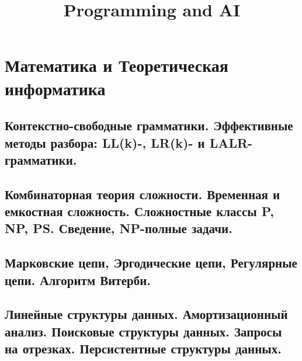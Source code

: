 \documentclass{article}
\title{Programming and AI} %
\begin{document}
	
\maketitle %
\tableofcontents
\section{Математика и Теоретическая информатика}





























\subsection{Контекстно-свободные грамматики. Эффективные методы разбора: LL(k)-, LR(k)- и LALR-грамматики.}

\subsection{Комбинаторная теория сложности. Временная и емкостная сложность. Сложностные классы P, NP, PS. Сведение, NP-полные задачи.}

\subsection{Марковские цепи, Эргодические цепи, Регулярные цепи. Алгоритм Витерби.}

\subsection{Линейные структуры данных. Амортизационный анализ. Поисковые структуры данных. Запросы на отрезках. Персистентные структуры данных.}
\end{document}
